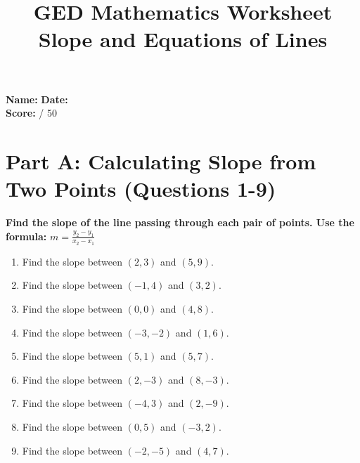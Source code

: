 \documentclass[12pt]{article}
\title{\textbf{GED Mathematics Worksheet} \\ \textbf{Slope and Equations of Lines}}
\author{}
\date{}
\begin{document}
\maketitle

\noindent\textbf{Name:} \underline{\hspace{3cm}} \quad \textbf{Date:} \underline{\hspace{3cm}} \\[0.2cm]
\noindent\textbf{Score:} \underline{\hspace{3cm}} / 50

\section*{Part A: Calculating Slope from Two Points (Questions 1-9)}

\noindent\textbf{Find the slope of the line passing through each pair of points. Use the formula: } $m = \frac{y_2 - y_1}{x_2 - x_1}$

\begin{enumerate}
\item Find the slope between $(2, 3)$ and $(5, 9)$.

\vspace{1cm}

\item Find the slope between $(-1, 4)$ and $(3, 2)$.

\vspace{1cm}

\item Find the slope between $(0, 0)$ and $(4, 8)$.

\vspace{1cm}

\item Find the slope between $(-3, -2)$ and $(1, 6)$.

\vspace{1cm}

\item Find the slope between $(5, 1)$ and $(5, 7)$.

\vspace{1cm}

\item Find the slope between $(2, -3)$ and $(8, -3)$.

\vspace{1cm}

\item Find the slope between $(-4, 3)$ and $(2, -9)$.

\vspace{1cm}

\item Find the slope between $(0, 5)$ and $(-3, 2)$.

\vspace{1cm}

\item Find the slope between $(-2, -5)$ and $(4, 7)$.

\vspace{1cm}

\end{enumerate}
\end{document}
